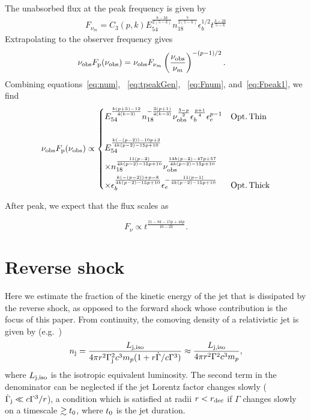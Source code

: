 \documentclass[usenatbib,fleqn]{mnras}
\begin{document}
The unabsorbed flux at the peak frequency is given by
\begin{align}
  F_{\nu_m} =  C_3(p, k) E_{54}^{\frac{8-3 k}{2 (5-k)}}
  n_{18}^{\frac{7}{2 (5-k)}} \epsilon_b^{1/2} t^{\frac{3-2 k}{5-k}}
\label{eq:Fnum}
\end{align}
%
Extrapolating to the observer frequency gives 
\begin{align}
  \nu_{\rm obs} F_{\rm p} (\nu_{\rm obs}) &= \nu_{\rm obs}   F_{\nu_m}
  \left(\frac{\nu_{\rm obs}}{\nu_m}\right)^{-(p-1)/2}.
  \label{eq:Fpeak1}
\end{align}
%
Combining equations~\eqref{eq:num}, ~\eqref{eq:tpeakGen}, ~\eqref{eq:Fnum},
and~\eqref{eq:Fpeak1}, we find
\begin{align}
  \nu_{\rm obs} F_{\rm p} (\nu_{\rm obs}) \propto
  \begin{dcases}
    E_{54}^{\frac{k (p+5)-12}{4 (k-3)}} n_{18}^{-\frac{3 (p+1)}{4
        (k-3)}} \nu_{\rm obs}^{\frac{3-p}{2}}
    \epsilon_b^{\frac{p+1}{4}} \epsilon_e^{p-1} & {\rm Opt.\, Thin}\\\\
    E_{54}^{\frac{k(-(p-2))-10 p+3}{4 k (p-2)-15 p+10}} \\ \times
    n_{18}^{\frac{11 (p-2)}{4 k (p-2)-15 p+10}} \nu_{\rm
      obs}^{\frac{14 k (p-2)-47 p+57}{4 k (p-2)-15 p+10}} \\ \times
    \epsilon_b^{\frac{k (-(p-2))+p-8}{4 k(p-2)-15 p+10}}
    \epsilon_e^{-\frac{11 (p-1)}{4 k (p-2)-15p+10}} & {\rm Opt.\,
    Thick}
  \end{dcases}
  \label{eq:peakLumGen}
\end{align}

After peak, we expect that the flux scales as 

\begin{equation}
F_{\nu}\propto t^{\frac{21-8k-15p+4kp}{10-2k}}.
\label{eq:tslope}
\end{equation}



\section{Reverse shock}
\label{sec:reverse}
Here we estimate the fraction of the kinetic energy of the jet that is
dissipated by the reverse shock, as opposed to the forward shock whose
contribution is the focus of this paper.  From continuity, the
comoving density of a relativistic jet is given by
(e.g.~\citealt{Uhm&Beloborodov2007})
 \begin{align}
   n_{\rm j} =  \frac{L_{\rm j, iso}}{4 \pi r^{2}\Gamma_{\rm
       j}^{2}c^{3}m_p(1 + r \dot{\Gamma}/c\Gamma^{3})}
   \approx  \frac{L_{\rm j, iso}}{4 \pi r^{2}\Gamma^{2}c^{3}m_p},
\end{align}
%
where $L_{\rm j, iso}$ is the isotropic equivalent luminosity.  The
second term in the denominator can be neglected if the jet Lorentz
factor changes slowly ($\dot{\Gamma}_{\rm j} \ll c\Gamma^{3}/r$), a
condition which is satisfied at radii $r < r_{\rm dec}$ if $\Gamma$
changes slowly on a timescale $\gtrsim t_{\rm 0}$, where $t_{\rm 0}$
is the jet duration.
\end{document}
